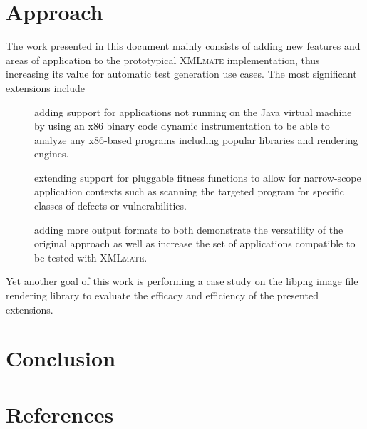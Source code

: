 \documentclass[a4paper,parskip=half]{scrartcl}
\newcommand{\java}{{\small Java}\xspace}
\newcommand{\xmlmate}{\textsc{XMLmate}\xspace}
\begin{document}

\newpage

\newpage

\newpage

\newpage
\tableofcontents
\newpage


\section{Approach}
\label{sec:approach}
The work presented in this document mainly consists of adding new features and areas of application to the
prototypical \xmlmate implementation, thus increasing its value for automatic test generation use cases. The
most significant extensions include 
\begin{description}
\item[]adding support for applications not running on the \java virtual machine by using an x86 binary code
dynamic instrumentation to be able to analyze any x86-based programs including popular libraries and rendering
engines.
\item[]extending support for pluggable fitness functions to allow for narrow-scope application contexts such as
scanning the targeted program for specific classes of defects or vulnerabilities.
\item[]adding more output formats to both demonstrate the versatility of the original approach as well as
increase the set of applications compatible to be tested with \xmlmate.
\end{description}

Yet another goal of this work is performing a case study on the libpng image file rendering library to evaluate
the efficacy and efficiency of the presented extensions.






\section{Conclusion}
\label{sec:conclusion}

\newpage
\section*{References}
\renewcommand\refname{}


\newpage
\listoftodos[Notes] %
\end{document}
